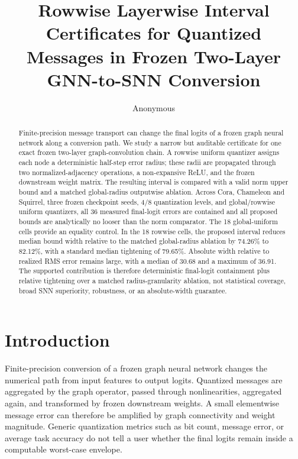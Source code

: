 \documentclass{article}
\title{Rowwise Layerwise Interval Certificates for Quantized Messages in Frozen Two-Layer GNN-to-SNN Conversion}
\author{Anonymous}
\begin{document}
\begin{abstract}
Finite-precision message transport can change the final logits of a frozen graph neural network along a conversion path. We study a narrow but auditable certificate for one exact frozen two-layer graph-convolution chain. A rowwise uniform quantizer assigns each node a deterministic half-step error radius; these radii are propagated through two normalized-adjacency operations, a non-expansive ReLU, and the frozen downstream weight matrix. The resulting interval is compared with a valid norm upper bound and a matched global-radius outputwise ablation. Across Cora, Chameleon and Squirrel, three frozen checkpoint seeds, 4/8 quantization levels, and global/rowwise uniform quantizers, all 36 measured final-logit errors are contained and all proposed bounds are analytically no looser than the norm comparator. The 18 global-uniform cells provide an equality control. In the 18 rowwise cells, the proposed interval reduces median bound width relative to the matched global-radius ablation by 74.26\% to 82.12\%, with a standard median tightening of 79.65\%. Absolute width relative to realized RMS error remains large, with a median of 30.68 and a maximum of 36.91. The supported contribution is therefore deterministic final-logit containment plus relative tightening over a matched radius-granularity ablation, not statistical coverage, broad SNN superiority, robustness, or an absolute-width guarantee.
\end{abstract}

\maketitle

\section{Introduction}

\label{sec:introduction}

Finite-precision conversion of a frozen graph neural network changes the numerical path from input features to output logits. Quantized messages are aggregated by the graph operator, passed through nonlinearities, aggregated again, and transformed by frozen downstream weights. A small elementwise message error can therefore be amplified by graph connectivity and weight magnitude. Generic quantization metrics such as bit count, message error, or average task accuracy do not tell a user whether the final logits remain inside a computable worst-case envelope.
\end{document}
